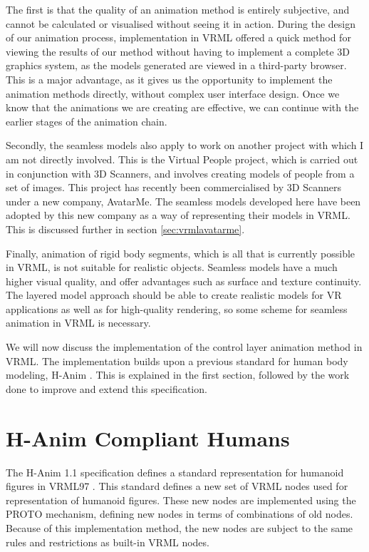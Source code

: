 \documentclass[10pt,oneside,fleqn,a4paper]{book}
\begin{document}
The first is that the quality of an animation method is entirely subjective, and cannot be calculated or visualised without seeing it in action. During the design of our animation process, implementation in VRML offered a quick method for viewing the results of our method without having to implement a complete 3D graphics system, as the models generated are viewed in a third-party browser. This is a major advantage, as it gives us the opportunity to implement the animation methods directly, without complex user interface design. Once we know that the animations we are creating are effective, we can continue with the earlier stages of the animation chain. 

Secondly, the seamless models also apply to work on another project with which I am not directly involved. This is the Virtual People project, which is carried out in conjunction with 3D Scanners, and involves creating models of people from a set of images. This project has recently been commercialised by 3D Scanners under a new company, AvatarMe. The seamless models developed here have been adopted by this new company as a way of representing their models in VRML. This is discussed further in section \ref{sec:vrmlavatarme}.

Finally, animation of rigid body segments, which is all that is currently possible in VRML, is not suitable for realistic objects. Seamless models have a much higher visual quality, and offer advantages such as surface and texture continuity. The layered model approach should be able to create realistic models for VR applications as well as for high-quality rendering, so some scheme for seamless animation in VRML is necessary.

We will now discuss the implementation of the control layer animation method in VRML. The implementation builds upon a previous standard for human body modeling, H-Anim \cite{HANIM99}. This is explained in the first section, followed by the work done to improve and extend this specification.

\section{\label{sec:vrmlhanim}H-Anim Compliant Humans}
The H-Anim 1.1 specification \cite{HANIM99} defines a standard representation for humanoid figures in VRML97 \cite{VRML97}. This standard defines a new set of VRML nodes used for representation of humanoid figures. These new nodes are implemented using the PROTO mechanism, defining new nodes in terms of combinations of old nodes. Because of this implementation method, the new nodes are subject to the same rules and restrictions as built-in VRML nodes.
\end{document}
